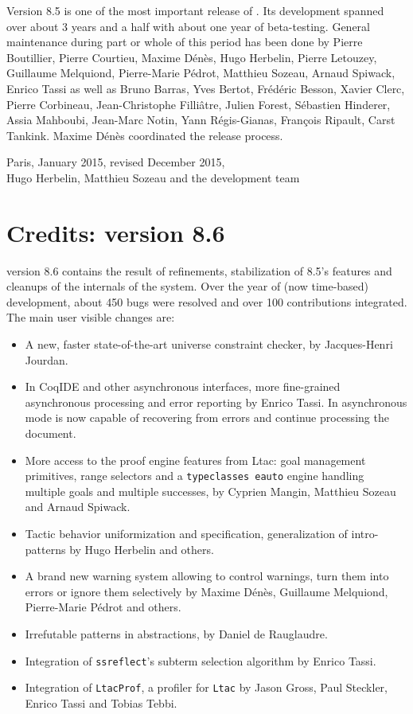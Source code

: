 Version 8.5 is one of the most important release of {\Coq}. Its
development spanned over about 3 years and a half with about one year
of beta-testing. General maintenance during part or whole of this
period has been done by Pierre Boutillier, Pierre Courtieu, Maxime
Dénès, Hugo Herbelin, Pierre Letouzey, Guillaume Melquiond,
Pierre-Marie Pédrot, Matthieu Sozeau, Arnaud Spiwack, Enrico Tassi as
well as Bruno Barras, Yves Bertot, Frédéric Besson, Xavier Clerc,
Pierre Corbineau, Jean-Christophe Filliâtre, Julien Forest, Sébastien
Hinderer, Assia Mahboubi, Jean-Marc Notin, Yann Régis-Gianas, François
Ripault, Carst Tankink. Maxime Dénès coordinated the release process.

\begin{flushright}
Paris, January 2015, revised December 2015,\\
Hugo Herbelin, Matthieu Sozeau and the {\Coq} development team\\
\end{flushright}

\section*{Credits: version 8.6}

{\Coq} version 8.6 contains the result of refinements, stabilization of
8.5's features and cleanups of the internals of the system. Over the
year of (now time-based) development, about 450 bugs were resolved and
over 100 contributions integrated. The main user visible changes are:
\begin{itemize}
\item A new, faster state-of-the-art universe constraint checker, by
  Jacques-Henri Jourdan.
\item In CoqIDE and other asynchronous interfaces, more fine-grained
  asynchronous processing and error reporting by Enrico Tassi. In
  asynchronous mode {\Coq} is now capable of recovering from errors 
  and continue processing the document.
\item More access to the proof engine features from Ltac: goal
  management primitives, range selectors and a {\tt typeclasses
    eauto} engine handling multiple goals and multiple successes, by
  Cyprien Mangin, Matthieu Sozeau and Arnaud Spiwack.
\item Tactic behavior uniformization and specification, generalization
  of intro-patterns by Hugo Herbelin and others.
\item A brand new warning system allowing to control warnings, turn them
  into errors or ignore them selectively by Maxime Dénès, Guillaume
  Melquiond, Pierre-Marie Pédrot and others.
\item Irrefutable patterns in abstractions, by Daniel de Rauglaudre.
\item Integration of {\tt ssreflect}'s subterm selection algorithm by
  Enrico Tassi.
\item Integration of {\tt LtacProf}, a profiler for {\tt Ltac} by Jason
  Gross, Paul Steckler, Enrico Tassi and Tobias Tebbi.
\end{itemize}

